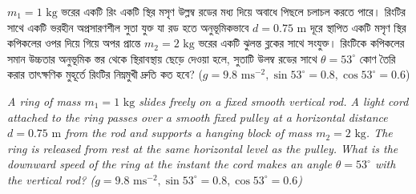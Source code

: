 \documentclass[12pt, a4paper]{article}
\begin{document}
\begin{tcolorbox}[questionbox={প্রশ্ন (Question) 10}]
    \noindent
    $m_1 = 1\text{ kg}$ ভরের একটি রিং একটি স্থির মসৃণ উল্লম্ব রডের মধ্য দিয়ে অবাধে পিছলে চলাচল করতে পারে। রিংটির সাথে একটি ভরহীন অপ্রসারণশীল সুতা যুক্ত যা রড হতে অনুভূমিকভাবে $d = 0.75\text{ m}$ দূরে স্থাপিত একটি মসৃণ স্থির কপিকলের ওপর দিয়ে গিয়ে অপর প্রান্তে $m_2 = 2\text{ kg}$ ভরের একটি ঝুলন্ত ব্লকের সাথে সংযুক্ত। রিংটিকে কপিকলের সমান উচ্চতার অনুভূমিক স্তর থেকে স্থিরাবস্থায় ছেড়ে দেওয়া হলে, সুতাটি উলম্ব রডের সাথে $\theta = 53^\circ$ কোণ তৈরি করার তাৎক্ষণিক মুহূর্তে রিংটির নিম্নমুখী দ্রুতি কত হবে? ($g = 9.8\text{ ms}^{-2}, \sin 53^\circ = 0.8, \cos 53^\circ = 0.6$)
    
    \vspace{0.8em}
    \begin{english}
    \noindent\textit{\color{darkgray}
    A ring of mass $m_1 = 1\text{ kg}$ slides freely on a fixed smooth vertical rod. A light cord attached to the ring passes over a smooth fixed pulley at a horizontal distance $d = 0.75\text{ m}$ from the rod and supports a hanging block of mass $m_2 = 2\text{ kg}$. The ring is released from rest at the same horizontal level as the pulley. What is the downward speed of the ring at the instant the cord makes an angle $\theta = 53^\circ$ with the vertical rod? ($g = 9.8\text{ ms}^{-2}, \sin 53^\circ = 0.8, \cos 53^\circ = 0.6$)
    }
    \end{english}
\end{tcolorbox}
\end{document}
